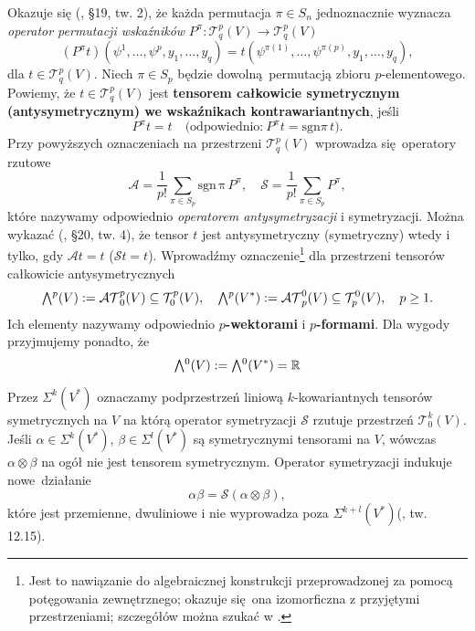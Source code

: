 Okazuje się (\cite{herdegen}, §19, tw. 2), że każda permutacja \(\pi\in S_n\) jednoznacznie wyznacza \emph{operator permutacji wskaźników} \(P^{\pi}:\mathcal{T}_q^p(V)\to\mathcal{T}_q^p(V)\)
\begin{equation*}
    (P^\pi t)(\psi^1, \dots, \psi^p, y_1, \dots, y_q) = t(\psi^{\pi(1)}, \dots, \psi^{\pi(p)}, y_1, \dots, y_q),
\end{equation*} dla \(t\in\mathcal{T}_q^p(V)\). Niech \(\pi\in S_p\) będzie dowolną permutacją zbioru \(p\)-elementowego. Powiemy, że \(t\in\mathcal{T}_q^p(V)\) jest \textbf{tensorem całkowicie symetrycznym (antysymetrycznym) we wskaźnikach kontrawariantnych}, jeśli 
\begin{equation*}
    P^\pi t = t\quad \text{(odpowiednio:}\ P^\pi t = \mathrm{sgn}\pi\, t\text{)}. 
\end{equation*}
Przy powyższych oznaczeniach na przestrzeni \(\mathcal{T}_q^p(V)\) wprowadza się operatory rzutowe
\begin{equation*}
    \mathcal{A}=\frac{1}{p!}\sum_{\pi\in S_p} \mathrm{sgn\,\pi}\,P^\pi,\quad \mathcal{S}=\frac{1}{p!}\sum_{\pi\in S_p} P^\pi,
\end{equation*}
które nazywamy odpowiednio \emph{operatorem antysymetryzacji} i symetryzacji. Można wykazać (\cite{herdegen}, §20, tw. 4), że tensor \(t\) jest antysymetryczny (symetryczny) wtedy i tylko, gdy \(\mathcal{A}t = t\)  (\(\mathcal{S}t = t\)). Wprowadźmy oznaczenie\footnote{Jest to nawiązanie do algebraicznej konstrukcji przeprowadzonej za pomocą potęgowania zewnętrznego; okazuje się ona izomorficzna z przyjętymi przestrzeniami; szczegółów można szukać w \cite{maurin2}.} dla przestrzeni tensorów całkowicie antysymetrycznych
\begin{align*}
    \Exterior^p(V):=\mathcal{AT}^p_0(V)\subseteq \mathcal{T}^p_0(V),\quad \Exterior^p(V^\ast):=\mathcal{AT}^0_p(V)\subseteq\mathcal{T}^0_p(V), \quad p\geq 1.
\end{align*}
Ich elementy nazywamy odpowiednio \textbf{\(p\)-wektorami} i \textbf{\(p\)-formami}. Dla wygody przyjmujemy ponadto, że
\begin{equation*}
     \Exterior^0(V):=\Exterior^0(V^\ast)=\R
\end{equation*}

Przez \(\Sigma^k(V^{\ast})\) oznaczamy podprzestrzeń liniową \(k\)-kowariantnych tensorów symetrycznych na \(V\) na którą operator symetryzacji \(\mathcal{S}\) rzutuje przestrzeń \(\mathcal{T}^k_0(V)\). Jeśli \(\alpha\in\Sigma^k(V^{\ast})\), \(\beta\in\Sigma^l(V^{\ast})\) są symetrycznymi tensorami na \(V\), wówczas \(\alpha\otimes\beta\) na ogół nie jest tensorem symetrycznym. Operator symetryzacji indukuje nowe działanie 
\begin{equation*}
    \alpha\beta = \mathcal{S}(\alpha\otimes\beta),
\end{equation*}
które jest przemienne, dwuliniowe i nie wyprowadza poza \(\Sigma^{k+l}(V^{\ast})\)(\cite{lee}, tw. 12.15).

